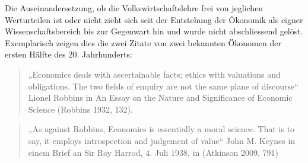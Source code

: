 \documentclass[
  nswissgerman,
  a4paper,
  DIV=11,
  numbers=noendperiod,
  oneside,
  openany]{scrreprt}
\begin{document}
Die Auseinandersetzung, ob die Volkswirtschaftslehre frei von jeglichen
Werturteilen ist oder nicht zieht sich seit der Entstehung der Ökonomik
als eigner Wissenschaftsbereich bis zur Gegenwart hin und wurde nicht
abschliessend gelöst. Exemplarisch zeigen dies die zwei Zitate von zwei
bekannten Ökonomen der ersten Hälfte des 20. Jahrhunderts:

\begin{quote}
„Economics deals with ascertainable facts; ethics with valuations and
obligations. The two fields of enquiry are not the same plane of
discourse`` Lionel Robbins in An Essay on the Nature and Significance of
Economic Science (Robbins 1932, 132).
\end{quote}

\begin{quote}
„As against Robbins, Economics is essentially a moral science. That is
to say, it employs introspection and judgement of value`` John M. Keynes
in einem Brief an Sir Roy Harrod, 4. Juli 1938, in (Atkinson 2009, 791)
\end{quote}
\end{document}
